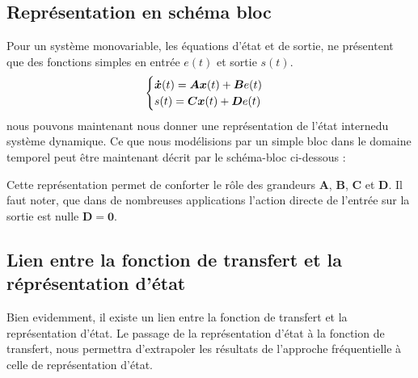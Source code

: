 \subsection{Représentation en schéma bloc}
Pour un système monovariable, les équations d'état et de sortie, ne présentent
que des fonctions simples en entrée $e(t)$ et sortie $s(t)$.
\[
\begin{cases}
    \boldsymbol{\dot{x}}(t)= \boldsymbol{A}\boldsymbol{x} (t) + \boldsymbol{B} e(t)\\
    s(t)=\boldsymbol{C} \boldsymbol{x} (t) + \boldsymbol{D} e(t)
\end{cases}
\]
nous pouvons maintenant nous donner une représentation de 
\og l'état interne\fg du système dynamique. Ce que nous 
modélisions par un simple bloc dans le domaine temporel peut être maintenant 
décrit par le schéma-bloc ci-dessous :
\begin{center}
    
\end{center}
Cette représentation permet de conforter le rôle des grandeurs $\boldsymbol{A}$,
$\boldsymbol{B}$, $\boldsymbol{C}$ et
$\boldsymbol{D}$. Il faut noter, que dans de nombreuses applications 
l'action directe de l'entrée sur la sortie est nulle $\boldsymbol{D=0}$.
\subsection{Lien entre la fonction de transfert et la réprésentation d'état}
Bien evidemment, il existe un lien entre la fonction de transfert et la 
représentation d'état. Le passage de la représentation d'état à la fonction
de transfert, nous permettra d'extrapoler les résultats de l'approche 
fréquentielle à celle de représentation d'état.

